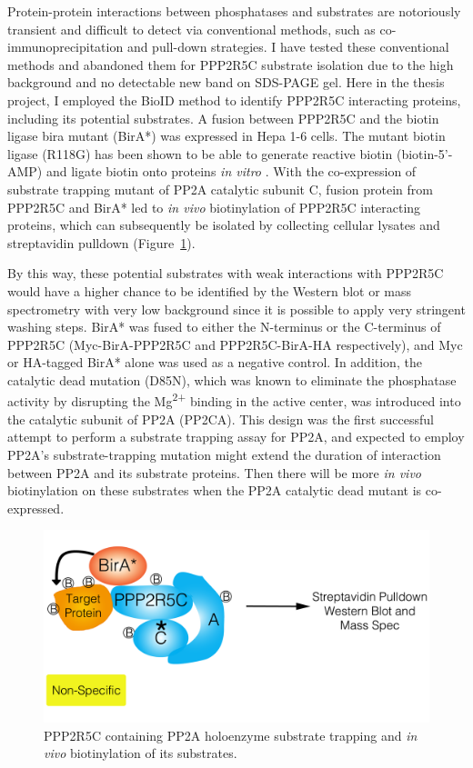 Protein-protein interactions between phosphatases and substrates are notoriously transient and difficult to detect via conventional methods, such as co-immunoprecipitation and pull-down strategies. I have tested these conventional methods and abandoned them for PPP2R5C substrate isolation due to the high background and no detectable new band on SDS-PAGE gel. Here in the thesis project, I employed the BioID method \cite{roux_promiscuous_2012}   to identify PPP2R5C interacting proteins, including its potential substrates. A fusion between PPP2R5C and the biotin ligase \gls{bira} mutant (BirA*) was expressed in Hepa 1-6 cells. The mutant biotin ligase (R118G) has been shown to be able to generate reactive biotin (biotin-5'-AMP) and ligate biotin onto proteins \textit{in vitro} \cite{choi-rhee_promiscuous_2004,cronan_targeted_2005}. With the co-expression of substrate trapping mutant of PP2A catalytic subunit C, fusion protein from PPP2R5C and BirA* led to \textit{in vivo} biotinylation of PPP2R5C interacting proteins, which can subsequently be isolated by collecting cellular lysates and streptavidin pulldown (Figure~\ref{fig:fig2.46}). 

By this way, these potential substrates with weak interactions with PPP2R5C would have a higher chance to be identified by the Western blot or mass spectrometry with very low background since it is possible to apply very stringent washing steps. BirA* was fused to either the N-terminus or the C-terminus of PPP2R5C (Myc-BirA-PPP2R5C and PPP2R5C-BirA-HA respectively), and Myc or HA-tagged BirA* alone was used as a negative control. In addition, the catalytic dead mutation (D85N), which was known to eliminate the phosphatase activity \cite{ogris_catalytically_1999} by disrupting the Mg\textsuperscript{2+} binding in the active center, was introduced into the catalytic subunit of \gls{PP2A} (PP2CA). This design was the first successful attempt to perform a substrate trapping assay for PP2A, and expected to employ \gls{PP2A}'s substrate-trapping mutation might extend the duration of interaction between \gls{PP2A} and its substrate proteins. Then there will be more \textit{in vivo} biotinylation on these substrates when the PP2A catalytic dead mutant is co-expressed. 

\begin{figure}[htbp]
\centering
\includegraphics[width=1\textwidth]{figs/fig2-46 bioID scheme.png}
\caption[PPP2R5C substrate trapping scheme]{\footnotesize PPP2R5C containing PP2A holoenzyme substrate trapping and \textit{in vivo} biotinylation of its substrates.}
\label{fig:fig2.46}
\end{figure}


